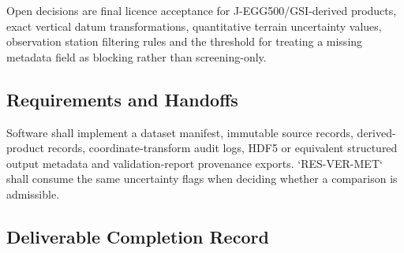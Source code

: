 Open decisions are final licence acceptance for J-EGG500/GSI-derived
products, exact vertical datum transformations, quantitative terrain
uncertainty values, observation station filtering rules and the
threshold for treating a missing metadata field as blocking rather than
screening-only.

\subsection{Requirements and Handoffs}
\label{sec:res-dat-unc-requirements}

Software shall implement a dataset manifest, immutable source records,
derived-product records, coordinate-transform audit logs, HDF5 or
equivalent structured output metadata and validation-report provenance
exports. `RES-VER-MET` shall consume the same uncertainty flags when
deciding whether a comparison is admissible.

\subsection{Deliverable Completion Record}
\label{sec:res-dat-unc-completion-record}

%
%
%
